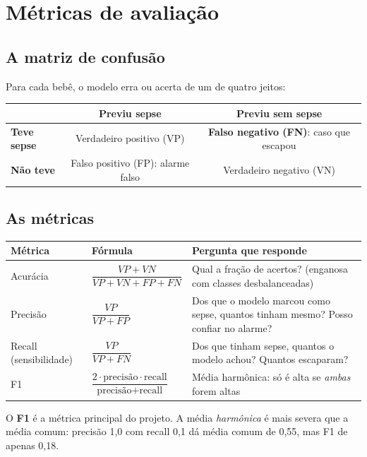 \documentclass[11pt,a4paper]{article}
\begin{document}
\section{Métricas de avaliação}

\subsection{A matriz de confusão}

Para cada bebê, o modelo erra ou acerta de um de quatro jeitos:

\begin{center}
\begin{tabular}{@{}l|c|c@{}}
 & \textbf{Previu sepse} & \textbf{Previu sem sepse} \\ \hline
\textbf{Teve sepse} & Verdadeiro positivo (VP) & \textbf{Falso negativo (FN)}: caso que escapou \\ \hline
\textbf{Não teve} & Falso positivo (FP): alarme falso & Verdadeiro negativo (VN) \\
\end{tabular}
\end{center}

\subsection{As métricas}

\begin{center}
\renewcommand{\arraystretch}{1.5}
\begin{tabular}{@{}llp{6cm}@{}}
\toprule
\textbf{Métrica} & \textbf{Fórmula} & \textbf{Pergunta que responde} \\
\midrule
Acurácia & $\dfrac{VP+VN}{VP+VN+FP+FN}$ & Qual a fração de acertos? (enganosa com classes desbalanceadas) \\
Precisão & $\dfrac{VP}{VP+FP}$ & Dos que o modelo marcou como sepse, quantos tinham mesmo? Posso confiar no alarme? \\
Recall (sensibilidade) & $\dfrac{VP}{VP+FN}$ & Dos que tinham sepse, quantos o modelo achou? Quantos escaparam? \\
F1 & $\dfrac{2\cdot\text{precisão}\cdot\text{recall}}{\text{precisão}+\text{recall}}$ & Média harmônica: só é alta se \emph{ambas} forem altas \\
\bottomrule
\end{tabular}
\end{center}

O \textbf{F1} é a métrica principal do projeto. A média \emph{harmônica} é mais severa que a média comum: precisão 1,0 com recall 0,1 dá média comum de 0,55, mas F1 de apenas 0,18.
\end{document}
